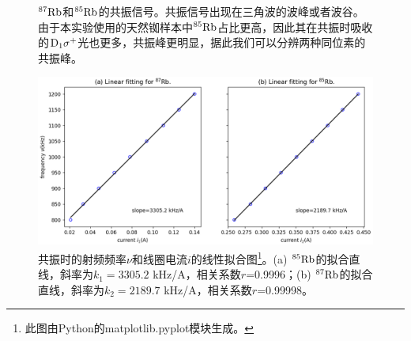 \documentclass[font=default]{mpltx}
\begin{document}
\begin{figure}[h]
  \centering 
  \caption{${\rm ^{87}Rb}$和${\rm ^{85}Rb}$的共振信号。共振信号出现在三角波的波峰或者波谷。由于本实验使用的天然铷样本中${\rm ^{85}Rb}$占比更高，因此其在共振时吸收的${\rm D_1\sigma^+}$光也更多，共振峰更明显，据此我们可以分辨两种同位素的共振峰。}
  \label{resonance_85_87}
\end{figure}
\begin{figure}[h]
  \centering
  \includegraphics[width=0.9\linewidth]{fig/linfit.png}
  \caption{共振时的射频频率$\nu$和线圈电流$i$的线性拟合图\footnote{此图由Python的matplotlib.pyplot模块生成。}。(a) ${\rm ^{85}Rb}$的拟合直线，斜率为$k_1=3305.2$ kHz/A，相关系数$r$=0.9996；(b) ${\rm ^{87}Rb}$的拟合直线，斜率为$k_2=2189.7$ kHz/A，相关系数$r$=0.99998。}
  \label{linfit}
\end{figure}
\end{document}
